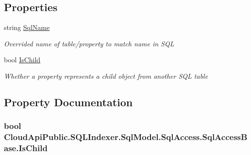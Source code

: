 \subsection*{Properties}
\begin{DoxyCompactItemize}
\item 
string \hyperlink{class_cloud_api_public_1_1_s_q_l_indexer_1_1_sql_model_1_1_sql_access_1_1_sql_access_base_ae9093d6a0cfb633b4de891c2060959c0}{Sql\-Name}
\begin{DoxyCompactList}\small\item\em Overrided name of table/property to match name in S\-Q\-L \end{DoxyCompactList}\item 
bool \hyperlink{class_cloud_api_public_1_1_s_q_l_indexer_1_1_sql_model_1_1_sql_access_1_1_sql_access_base_adaa12256709e63d6b881804ae45c5531}{Is\-Child}
\begin{DoxyCompactList}\small\item\em Whether a property represents a child object from another S\-Q\-L table \end{DoxyCompactList}\end{DoxyCompactItemize}


\subsection{Property Documentation}
\hypertarget{class_cloud_api_public_1_1_s_q_l_indexer_1_1_sql_model_1_1_sql_access_1_1_sql_access_base_adaa12256709e63d6b881804ae45c5531}{
\subsubsection[{Is\-Child}]{\setlength{\rightskip}{0pt plus 5cm}bool Cloud\-Api\-Public.\-S\-Q\-L\-Indexer.\-Sql\-Model.\-Sql\-Access.\-Sql\-Access\-Base.\-Is\-Child\hspace{0.3cm}{\ttfamily [get]}}}\label{class_cloud_api_public_1_1_s_q_l_indexer_1_1_sql_model_1_1_sql_access_1_1_sql_access_base_adaa12256709e63d6b881804ae45c5531}



